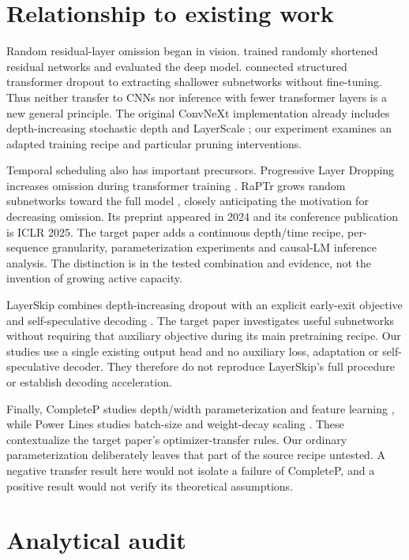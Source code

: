 \documentclass[10pt,letterpaper]{article}
\begin{document}
\section{Relationship to existing work}
Random residual-layer omission began in vision. \citet{huang} trained randomly shortened residual networks and evaluated the deep model. \citet{layerdrop} connected structured transformer dropout to extracting shallower subnetworks without fine-tuning. Thus neither transfer to CNNs nor inference with fewer transformer layers is a new general principle. The original ConvNeXt implementation already includes depth-increasing stochastic depth and LayerScale \citep{convnext}; our experiment examines an adapted training recipe and particular pruning interventions.

Temporal scheduling also has important precursors. Progressive Layer Dropping increases omission during transformer training \citep{progressive}. RaPTr grows random subnetworks toward the full model \citep{raptr}, closely anticipating the motivation for decreasing omission. Its preprint appeared in 2024 and its conference publication is ICLR 2025. The target paper adds a continuous depth/time recipe, per-sequence granularity, parameterization experiments and causal-LM inference analysis. The distinction is in the tested combination and evidence, not the invention of growing active capacity.

LayerSkip combines depth-increasing dropout with an explicit early-exit objective and self-speculative decoding \citep{layerskip}. The target paper investigates useful subnetworks without requiring that auxiliary objective during its main pretraining recipe. Our studies use a single existing output head and no auxiliary loss, adaptation or self-speculative decoder. They therefore do not reproduce LayerSkip's full procedure or establish decoding acceleration.

Finally, CompleteP studies depth/width parameterization and feature learning \citep{completep}, while Power Lines studies batch-size and weight-decay scaling \citep{powerlines}. These contextualize the target paper's optimizer-transfer rules. Our ordinary parameterization deliberately leaves that part of the source recipe untested. A negative transfer result here would not isolate a failure of CompleteP, and a positive result would not verify its theoretical assumptions.

\clearpage
\section{Analytical audit}
\end{document}
